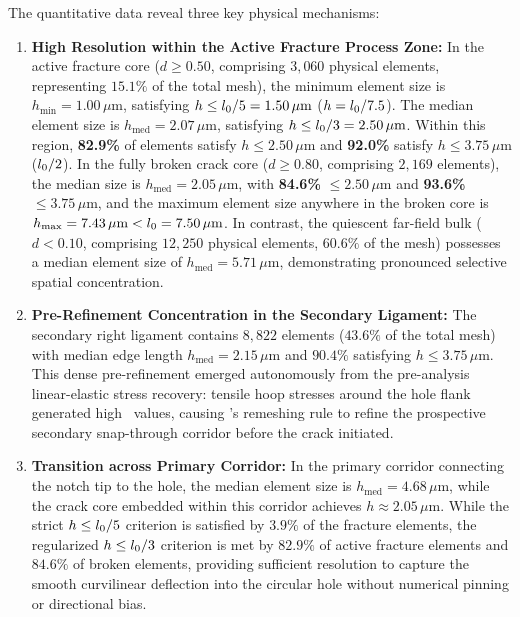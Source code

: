 The quantitative data reveal three key physical mechanisms:
\begin{enumerate}
  \item \textbf{High Resolution within the Active Fracture Process Zone:} In the active fracture core ($d \ge 0.50$, comprising $3{,}060$ physical elements, representing $15.1\%$ of the total mesh), the minimum element size is $h_{\min} = 1.00\,\mu\mathrm{m}$, satisfying $h \le l_0 / 5 = 1.50\,\mu\mathrm{m}$ ($h = l_0 / 7.5$). The median element size is $h_{\mathrm{med}} = 2.07\,\mu\mathrm{m}$, satisfying $h \le l_0 / 3 = 2.50\,\mu\mathrm{m}$. Within this region, \textbf{82.9\%} of elements satisfy $h \le 2.50\,\mu\mathrm{m}$ and \textbf{92.0\%} satisfy $h \le 3.75\,\mu\mathrm{m}$ ($l_0 / 2$). In the fully broken crack core ($d \ge 0.80$, comprising $2{,}169$ elements), the median size is $h_{\mathrm{med}} = 2.05\,\mu\mathrm{m}$, with \textbf{84.6\%} $\le 2.50\,\mu\mathrm{m}$ and \textbf{93.6\%} $\le 3.75\,\mu\mathrm{m}$, and the maximum element size anywhere in the broken core is $h_{\max} = 7.43\,\mu\mathrm{m} < l_0 = 7.50\,\mu\mathrm{m}$. In contrast, the quiescent far-field bulk ($d < 0.10$, comprising $12{,}250$ physical elements, $60.6\%$ of the mesh) possesses a median element size of $h_{\mathrm{med}} = 5.71\,\mu\mathrm{m}$, demonstrating pronounced selective spatial concentration.
  \item \textbf{Pre-Refinement Concentration in the Secondary Ligament:} The secondary right ligament contains $8{,}822$ elements ($43.6\%$ of the total mesh) with median edge length $h_{\mathrm{med}} = 2.15\,\mu\mathrm{m}$ and $90.4\%$ satisfying $h \le 3.75\,\mu\mathrm{m}$. This dense pre-refinement emerged autonomously from the pre-analysis linear-elastic stress recovery: tensile hoop stresses around the hole flank generated high \MISESERI\ values, causing \Abaqus's remeshing rule to refine the prospective secondary snap-through corridor before the crack initiated.
  \item \textbf{Transition across Primary Corridor:} In the primary corridor connecting the notch tip to the hole, the median element size is $h_{\mathrm{med}} = 4.68\,\mu\mathrm{m}$, while the crack core embedded within this corridor achieves $h \approx 2.05\,\mu\mathrm{m}$. While the strict $h \le l_0 / 5$ criterion is satisfied by $3.9\%$ of the fracture elements, the regularized $h \le l_0 / 3$ criterion is met by $82.9\%$ of active fracture elements and $84.6\%$ of broken elements, providing sufficient resolution to capture the smooth curvilinear deflection into the circular hole without numerical pinning or directional bias.
\end{enumerate}

